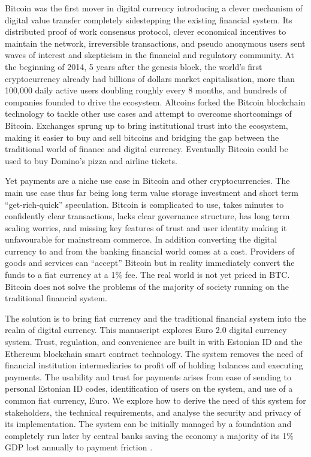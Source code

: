 \documentclass[12pt]{article} %
\begin{document}
Bitcoin was the first mover in digital currency introducing a clever mechanism of digital value transfer completely sidestepping the existing financial system\cite{nakamoto2008bitcoin}. Its distributed proof of work consensus protocol, clever economical incentives to maintain the network, irreversible transactions, and pseudo anonymous users sent waves of interest and skepticism in the financial and regulatory community. At the beginning of 2014, 5 years after the genesis block, the world's first cryptocurrency already had billions of dollars market capitalisation\cite{coinmarketcap2017bitcoin}, more than 100,000 daily active users doubling roughly every 8 months\cite{RePEc:fip:fedgfe:2014-104}, and hundreds of companies founded to drive the ecosystem. Altcoins forked the Bitcoin blockchain technology to tackle other use cases and attempt to overcome shortcomings of Bitcoin. Exchanges sprung up to bring institutional trust into the ecosystem, making it easier to buy and sell bitcoins and bridging the gap between the traditional world of finance and digital currency. Eventually Bitcoin could be used to buy Domino's pizza and airline tickets.

Yet payments are a niche use case in Bitcoin and other cryptocurrencies\cite{sas2016design}. The main use case thus far being long term value storage investment and short term ``get-rich-quick'' speculation. Bitcoin is complicated to use, takes minutes to confidently clear transactions, lacks clear governance structure, has long term scaling worries, and missing key features of trust and user identity making it unfavourable for mainstream commerce. In addition converting the digital currency to and from the banking financial world comes at a cost. Providers of goods and services can ``accept'' Bitcoin but in reality immediately convert the funds to a fiat currency at a 1\% fee. The real world is not yet priced in BTC. Bitcoin does not solve the problems of the majority of society running on the traditional financial system.

The solution is to bring fiat currency and the traditional financial system into the realm of digital currency. This manuscript explores Euro 2.0 digital currency system. Trust, regulation, and convenience are built in with Estonian ID and the Ethereum blockchain smart contract technology. The system removes the need of financial institution intermediaries to profit off of holding balances and executing payments. The usability and trust for payments arises from ease of sending to personal Estonian ID codes, identification of users on the system, and use of a common fiat currency, Euro. We explore how to derive the need of this system for stakeholders, the technical requirements, and analyse the security and privacy of its implementation. The system can be initially managed by a foundation and completely run later by central banks saving the economy a majority of its 1\% GDP lost annually to payment friction \cite{kaarmann2013cost}.
\end{document}
